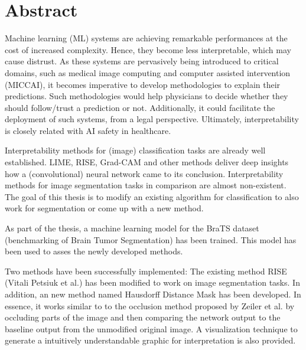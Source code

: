 \chapter*{Abstract}
\label{chap:managementSummary}

Machine learning (ML) systems are achieving remarkable performances at the cost of increased complexity. Hence, they become less interpretable, which may cause distrust. As these systems are pervasively being introduced to critical domains, such as medical image computing and computer assisted intervention (MICCAI), it becomes imperative to develop methodologies to explain their predictions. Such methodologies would help physicians to decide whether they should follow/trust a prediction or not. Additionally, it could facilitate the deployment of such systems, from a legal perspective. Ultimately, interpretability is closely related with AI safety in healthcare.

Interpretability methods for (image) classification tasks are already well established. LIME, RISE, Grad-CAM and other methods deliver deep insights how a (convolutional) neural network came to its conclusion. Interpretability methods for image segmentation tasks in comparison are almost non-existent. The goal of this thesis is to modify an existing algorithm for classification to also work for segmentation or come up with a new method.

As part of the thesis, a machine learning model for the BraTS dataset (benchmarking of Brain Tumor Segmentation) has been trained. This model has been used to asses the newly developed methods.

Two methods have been successfully implemented: The existing method RISE (Vitali Petsiuk et al.) has been modified to work on image segmentation tasks. In addition, an new method named Hausdorff Distance Mask has been developed. In essence, it works similar to to the occlusion method proposed by Zeiler et al. by occluding parts of the image and then comparing the network output to the baseline output from the unmodified original image. A visualization technique to generate a intuitively understandable graphic for interpretation is also provided.